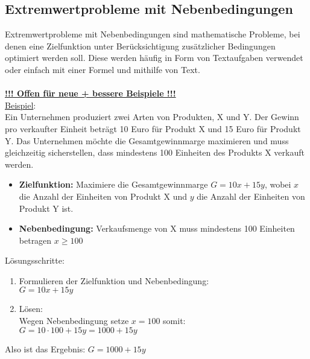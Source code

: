 \subsection{Extremwertprobleme mit Nebenbedingungen}
Extremwertprobleme mit Nebenbedingungen sind mathematische Probleme, 
bei denen eine Zielfunktion unter Berücksichtigung zusätzlicher Bedingungen optimiert werden soll. 
Diese werden häufig in Form von Textaufgaben verwendet oder einfach mit einer Formel und mithilfe von Text. \\\\
\underline{\textbf{!!! Offen für neue + bessere Beispiele !!!}} \\
\underline{Beispiel}: \\
Ein Unternehmen produziert zwei Arten von Produkten, X und Y. 
Der Gewinn pro verkaufter Einheit beträgt 10 Euro für Produkt X und 15 Euro für Produkt Y. 
Das Unternehmen möchte die Gesamtgewinnmarge maximieren und muss gleichzeitig sicherstellen, 
dass mindestens 100 Einheiten des Produkts X verkauft werden.
\begin{itemize}
    \item \textbf{Zielfunktion:} Maximiere die Gesamtgewinnmarge $G = 10x + 15y$, 
        wobei $x$ die Anzahl der Einheiten von Produkt X und $y$ die Anzahl der Einheiten von Produkt Y ist.
    \item \textbf{Nebenbedingung:} Verkaufsmenge von X muss mindestens 100 Einheiten betragen $x \geq 100$
\end{itemize}
Lösungsschritte: \\
\begin{enumerate}
    \item Formulieren der Zielfunktion und Nebenbedingung: \\
        $G = 10x + 15y$
    \item Lösen: \\
        Wegen Nebenbedingung setze $x = 100$ somit: \\
        $G = 10 \cdot 100 + 15y = 1000 + 15y$
\end{enumerate}
Also ist das Ergebnis: $G = 1000 + 15y$ \\\\
\
